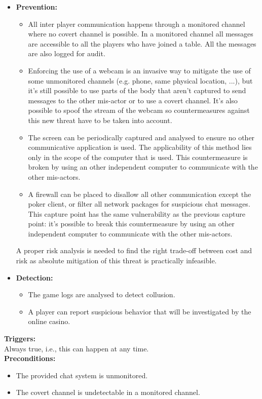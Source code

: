 \documentclass[a4paper,11pt]{report}
\begin{document}
\begin{itemize}
\item \textbf{Prevention:}
\begin{itemize}
\item All inter player communication happens through a monitored channel where no covert channel is possible. In a monitored channel all messages are accessible to all the players who have joined a table. All the messages are also logged for audit.
\item Enforcing the use of a webcam is an invasive way to mitigate the use of some unmonitored channels (e.g. phone, same physical location, ...), but it's still possible to use parts of the body that aren't captured to send messages to the other mis-actor or to use a covert channel. It's also possible to spoof the stream of the webcam so countermeasures against this new threat have to be taken into account.
\item The screen can be periodically captured and analysed to ensure no other communicative application is used. The applicability of this method lies only in the scope of the computer that is used. This countermeasure is broken by using an other independent computer to communicate with the other mis-actors.
\item A firewall can be placed to disallow all other communication except the poker client, or filter all network packages for suspicious chat messages. This capture point has the same vulnerability as the previous capture point: it's possible to break this countermeasure by using an other independent computer to communicate with the other mis-actors.
\end{itemize}
A proper risk analysis is needed to find the right trade-off between cost and risk as absolute mitigation of this threat is practically infeasible. 
\item \textbf{Detection:}
\begin{itemize}
\item The game logs are analysed to detect collusion.
\item A player can report suspicious behavior that will be investigated by the online casino.
\end{itemize}
\end{itemize}
\textbf{Triggers:}\\
Always true, i.e., this can happen at any time. \\
\textbf{Preconditions:}
\begin{itemize}
\item The provided chat system is unmonitored.
\item The covert channel is undetectable in a monitored channel.
\end{itemize}
\end{document}
